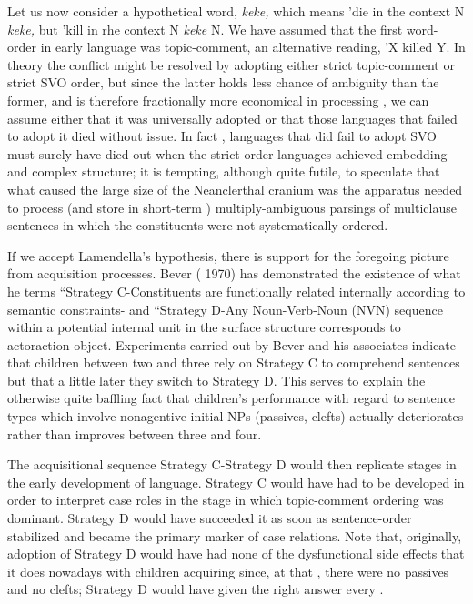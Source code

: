 Let us now consider a hypothetical word, \textit{keke,} which means
'die in the context N \textit{keke,} but 'kill in rhe context N \textit{keke} N. We have assumed that the first word-order in early language was topic-comment,
an alternative reading, 'X killed Y. In theory the conflict might be
resolved by adopting either strict topic-comment or strict SVO order, but since the latter holds less chance of ambiguity than the former, and is therefore fractionally more economical in processing , we can assume either that it was universally adopted or that those languages that failed to adopt it died without issue. In fact , languages that did
fail to adopt SVO must surely have died out when the strict-order
languages achieved embedding and complex structure; it is tempting, although quite futile, to speculate that what caused the large size of the Neanclerthal cranium was the apparatus needed to process (and store in short-term ) multiply-ambiguous parsings of multiclause sentences in which the constituents were not systematically ordered.

If we accept Lamendella's hypothesis, there is support for the foregoing picture from acquisition processes. Bever ( 1970) has demon\-strated the existence of what he terms ``Strategy C{\textquotedbl}{}-{\textquotedbl}Constituents are functionally related internally according to semantic constraints{\textquotedbl}- and ``Strategy D{\textquotedbl}{}-{\textquotedbl}Any Noun-Verb-Noun (NVN) sequence within a potential internal unit in the surface structure corresponds to actor\-action-object. Experiments carried out by Bever and his associates indicate that children between two and three rely on Strategy C to comprehend sentences but that a little later they switch to Strategy D. This serves to explain the otherwise quite baffling fact that children's performance with regard to sentence types which involve nonagentive initial NPs (passives, clefts) actually deteriorates rather than improves between three and four.

The acquisitional sequence Strategy C-Strategy D would then replicate stages in the early development of language. Strategy C would have had to be developed in order to interpret case roles in the stage
in which topic-comment ordering was dominant. Strategy D would have succeeded it as soon as sentence-order stabilized and became the pri\-mary marker of case relations. Note that, originally, adoption of Stra\-tegy D would have had none of the dysfunctional side effects that it does nowadays with children acquiring  since, at that , there were no passives and no clefts; Strategy D would have given the right answer every .

